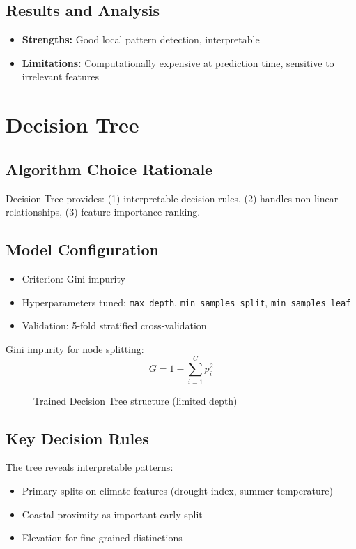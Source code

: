 \subsection*{Results and Analysis}
\begin{itemize}
    \item \textbf{Strengths:} Good local pattern detection, interpretable
    \item \textbf{Limitations:} Computationally expensive at prediction time, sensitive to irrelevant features
\end{itemize}

\section{Decision Tree}

\subsection*{Algorithm Choice Rationale}
Decision Tree provides: (1) interpretable decision rules, (2) handles non-linear relationships, (3) feature importance ranking.

\subsection*{Model Configuration}
\begin{itemize}
    \item Criterion: Gini impurity
    \item Hyperparameters tuned: \texttt{max\_depth}, \texttt{min\_samples\_split}, \texttt{min\_samples\_leaf}
    \item Validation: 5-fold stratified cross-validation
\end{itemize}

Gini impurity for node splitting:
\begin{equation}
    G = 1 - \sum_{i=1}^{C} p_i^2
\end{equation}

\begin{figure}[H]
    \centering
    \caption{Trained Decision Tree structure (limited depth)}
    \label{fig:dt_viz}
\end{figure}

\subsection*{Key Decision Rules}
The tree reveals interpretable patterns:
\begin{itemize}
    \item Primary splits on climate features (drought index, summer temperature)
    \item Coastal proximity as important early split
    \item Elevation for fine-grained distinctions
\end{itemize}

